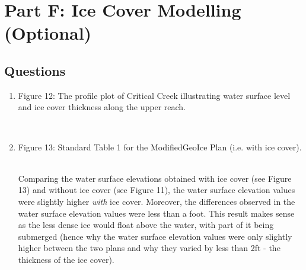 \documentclass[]{article}
\newcommand\setItemnumber[1]{\setcounter{enumi}{\numexpr#1-1\relax}}
\begin{document}
\section{Part F: Ice Cover Modelling (Optional)}
\noindent 
\subsection{Questions} \vspace{0.25cm}
\begin{enumerate}[label=\textbf{\arabic*.}] 
	\setItemnumber{15}
	\item \begin{minipage}[t]{\linewidth}
		\raggedright
		
		\medskip
		\begin{center} 
			Figure 12: The profile plot of Critical Creek illustrating water surface level and ice cover thickness along the upper reach.
		\end{center}
	\end{minipage}
	\setItemnumber{16} \\
	\item \begin{minipage}[t]{\linewidth}
		\raggedright
		
		\medskip
		\begin{center} 
			Figure 13: Standard Table 1 for the ModifiedGeoIce Plan (i.e. with ice cover).
		\end{center}
		\medskip 
	\end{minipage} \\
	Comparing the water surface elevations obtained with ice cover (see Figure 13) and without ice cover (see Figure 11), the water surface elevation values were slightly higher \textit{with} ice cover. Moreover, the differences observed in the water surface elevation values were less than a foot. This result makes sense as the less dense ice would float above the water, with part of it being submerged (hence why the water surface elevation values were only slightly higher between the two plans and why they varied by less than 2ft - the thickness of the ice cover).
\end{enumerate}
\end{document}
